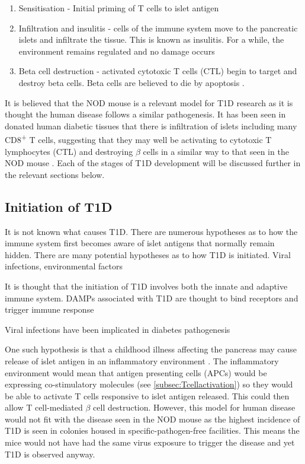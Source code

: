 \begin{enumerate}
\item Sensitisation - Initial priming of T cells to islet antigen
\item Infiltration and insulitis - cells of the immune system move to the pancreatic islets and infiltrate the tissue. This is known as insulitis. For a while, the environment remains regulated and no damage occurs
\item Beta cell destruction - activated cytotoxic T cells (CTL) begin to target and destroy beta cells. Beta cells are believed to die by apoptosis \citep{Cnop2005}.
\end{enumerate}

It is believed that the NOD mouse is a relevant model for T1D research as it is thought the human disease follows a similar pathogenesis.
It has been seen in donated human diabetic tissues that there is infiltration of islets including many CD8\textsuperscript{+} T cells, suggesting that they may well be activating to cytotoxic T lymphocytes (CTL) and destroying $\beta$ cells in a similar way to that seen in the NOD mouse \citep{Hanafusa2008}.
Each of the stages of T1D development will be discussed further in the relevant sections below.


\subsection{Initiation of T1D}


It is not known what causes T1D.
There are numerous hypotheses as to how the immune system first becomes aware of islet antigens that normally remain hidden.
There are many potential hypotheses as to how T1D is initiated.
Viral infections, environmental factors

It is thought that the initiation of T1D involves both the innate and adaptive immune system.
DAMPs associated with T1D are thought to bind receptors and trigger immune response \citep{Shin2015}

Viral infections have been implicated in diabetes pathogenesis

One such hypothesis is that a childhood illness affecting the pancreas may cause release of islet antigen in an inflammatory environment \citep{Green1999, Andreoletti1997}.
The inflammatory environment would mean that antigen presenting cells (APCs) would be expressing co-stimulatory molecules (see \cref{subsec:Tcellactivation}) so they would be able to activate T cells responsive to islet antigen released.
This could then allow T cell-mediated $\beta$ cell destruction.
However, this model for human disease would not fit with the disease seen in the NOD mouse as the highest incidence of T1D is seen in colonies housed in specific-pathogen-free facilities\citep{Delovitch1997}.
This means the mice would not have had the same virus exposure to trigger the disease and yet T1D is observed anyway.

